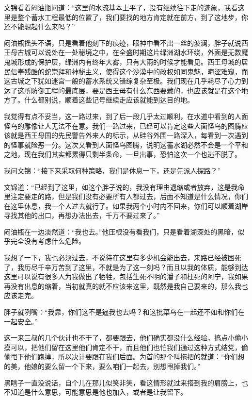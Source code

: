 文锦看着闷油瓶问道：“这里的水流基本上平了，没有继续往下走的迹象，我看这里是整个蓄水工程最低的位置了，我们要找的地方肯定就在前方，到了这地步，你还不能想起什么来吗？”

闷油瓶摇头不语，只是看着他刻下的痕迹，眼神中看不出一丝的波澜，胖子就说西王母古城可以说处在一处秘境之中，在全盛时期这片绿洲湖水环绕，外面是无数魔鬼城形成的保护层，绿洲内有终年大雾，只有大雨的时候才能看见。西王母城的居民信奉残酷的蛇崇拜和神秘主义，使得这个沙漠中的政权如同鬼魅，晦涩难窥，而这古城之下犹如迷宫一般的蓄水系统又错综复杂至极。我们现在几乎耗尽了心力到达了这所防御工程的最底层，要是西王母有什么东西要藏的，也应该就是在这个地方了。什么都别说，顺着这些记号继续走应该就能到达目的地。

我觉得有点不妥当，这一路过来，到了后一段几乎太过顺利，在水道中看到的人面怪鸟的雕像让人无法不在意。我们一路过来，已经可以肯定这些人面怪鸟的图腾应该就是西王母国的先民警告外来人的标示，从硅谷外围一路深入，每看到一次遇到的怪事就险恶一分。这次又看到人面怪鸟图腾，说明这蓄水湖必然不会是一个平和之地，现在我们其实都累得只剩半条命，一旦出事，恐怕这次一个也逃不脱了。

我问文锦：“接下来采取何种策略，我们是休息一下，还是先派人探路？”

文锦道：“已经到了这里，如这个胖子说的，我没有理由退缩或者放弃，这是我命里注定要走的路，但是我们没有必要所有人都过去，后面不知道是什么情况，你们在这里休息，我一个人过去就行了。如果我两个小时内不回来，你们可以顺着湖岸寻找其他的出口，再想办法出去，千万不要过来了。”

闷油瓶在一边淡然道：“我也去。”他压根没有看我们，只是看着湖深处的黑暗，似乎完全没有考虑什么危险。

我想了一下，我也必须过去，不说待在这里有多少机会能出去，来路已经被困死了，我历尽千辛万苦到了这里，不就是为了这一刻吗？而且以我的体质，能够到达这里可以说有很多人为我做出了牺牲，包括生死不明的潘子和枉死的阿宁，我如果再没有出息的缩着，当初就真的就不应该来这里，既然是我自己要来的，那么我也应该走完。

胖子就咧嘴：“我靠，你们这不是逼我也去吗？和这批菜鸟在一起还不如和你们在一起安全。”

这一来三叔的几个伙计也不干了，都要跟去，他们确实都没什么经验，搞点小偷小摸可以，把他们留在这里他们肯定不干，而且他们也怕我们通过这种方式结党，偷偷甩下他们跑掉，所以决计要跟在我们后面。为首的那个叫拖把的就道：“你们想的美，他娘的要么留一个下来，要么咱们一起去，别想甩掉我们。”

黑瞎子一直没说话，自个儿在那儿似笑非笑，看这情形就过来搭到我的肩膀上，也不知道是什么意思，可能意思是他也加入，或者是让我留下。

